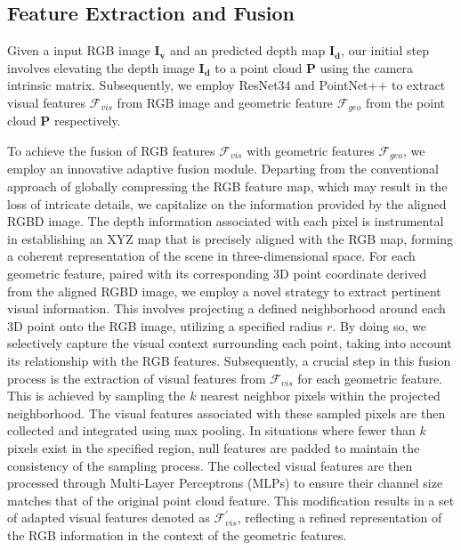\subsection{Feature Extraction and  Fusion}

Given a input RGB image $\mathbf{I_v}$ and an predicted depth map $\mathbf{I_d}$, our initial step involves elevating the depth image $\mathbf{I_d}$ to a point cloud $\mathbf{P}$ using the camera intrinsic matrix. Subsequently, we employ ResNet34 \cite{he2016deep} and PointNet++ \cite{qi2017pointnet++} to extract visual features $\mathcal{F}_{vis}$ from RGB image and geometric feature $\mathcal{F}_{geo}$ from the point cloud $\mathbf{P}$ respectively. 

To achieve the fusion of RGB features $\mathcal{F}_{vis}$ with geometric features $\mathcal{F}_{geo}$, we employ an innovative adaptive fusion module. Departing from the conventional approach of globally compressing the RGB feature map, which may result in the loss of intricate details, we capitalize on the information provided by the aligned RGBD image. The depth information associated with each pixel is instrumental in establishing an XYZ map that is precisely aligned with the RGB map, forming a coherent representation of the scene in three-dimensional space. For each geometric feature, paired with its corresponding 3D point coordinate derived from the aligned RGBD image, we employ a novel strategy to extract pertinent visual information. This involves projecting a defined neighborhood around each 3D point onto the RGB image, utilizing a specified radius $r$. By doing so, we selectively capture the visual context surrounding each point, taking into account its relationship with the RGB features. Subsequently, a crucial step in this fusion process is the extraction of visual features from $\mathcal{F}_{vis}$ for each geometric feature. This is achieved by sampling the $k$ nearest neighbor pixels within the projected neighborhood. The visual features associated with these sampled pixels are then collected and integrated using max pooling. In situations where fewer than $k$ pixels exist in the specified region, null features are padded to maintain the consistency of the sampling process. The collected visual features are then processed through Multi-Layer Perceptrons (MLPs) to ensure their channel size matches that of the original point cloud feature. This modification results in a set of adapted visual features denoted as $\mathcal{F}_{vis}^{'}$, reflecting a refined representation of the RGB information in the context of the geometric features.

